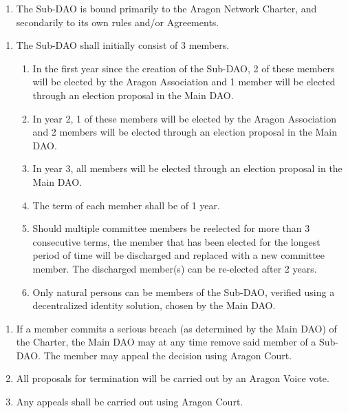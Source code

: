 
\label{chap:SubDAOAgreements}

\begin{enumerate}
	
	\begin{enumerate}
		
		\begin{enumerate}
			\item The Sub-\ac{DAO} is bound primarily to the Aragon Network Charter, and secondarily to its own rules and/or Agreements.
		\end{enumerate}
		
		\begin{enumerate}
			\item The Sub-\ac{DAO} shall initially consist of 3 members.
			\begin{enumerate}
				\item In the first year since the creation of the Sub-\ac{DAO}, 2 of these
				members will be elected by the Aragon Association and 1 member
				will be elected through an election proposal in the Main \ac{DAO}.
				\item In year 2, 1 of these members will be elected by the Aragon
				Association and 2 members will be elected through an election
				proposal in the Main \ac{DAO}.
				\item In year 3, all members will be elected through an election proposal
				in the Main \ac{DAO}.
				\item The term of each member shall be of 1 year.
				\item Should multiple committee members be reelected for more than 3
				consecutive terms, the member that has been elected for the longest period of time will be discharged and replaced with a new committee member. The discharged member(s) can be re-elected after 2 years.
				\item Only natural persons can be members of the Sub-\ac{DAO}, verified using a decentralized identity solution, chosen by the Main \ac{DAO}.
			\end{enumerate}
		\end{enumerate}
		
		\begin{enumerate}
			\item If a member commits a serious breach (as determined by the Main \ac{DAO}) of the Charter, the Main \ac{DAO} may at any time remove said member of a Sub-\ac{DAO}. The member may appeal the decision using Aragon Court.
			\item All proposals for termination will be carried out by an Aragon Voice vote.
			\item Any appeals shall be carried out using Aragon Court.
			\end{enumerate}
		

\end{enumerate}
\end{enumerate}
